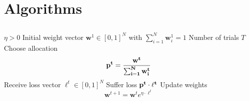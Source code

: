 
\chapter{Algorithms}
\label{app:algo}

\section{\hedge}
\label{app:hedge}

\begin{algorithm}
\caption{\hedge}
\begin{algorithmic}[1]
\Require 
\Statex $\eta>0$
\Statex Initial weight vector $\mathbf{w}^1\in [0,1]^N$ with $\sum_{i=1}^N \mathbf{w}^1_i=1$
\Statex Number of trials $T$
\State Choose allocation $$\bf p^t= \frac{\bf w^t}{\sum_{i=1}^N w^t_i}$$
\State Receive loss vector $\ell^t\in[0,1]^N$
\State Suffer loss $\bf p^t\cdot \ell^t$
\State Update weights $$\mathbf{w}^{t+1}=\mathbf{w}^te^{\eta\cdot\ell^{t}}$$
\EndFor
\EndProcedure
\end{algorithmic}
\end{algorithm}
\newpage
\section{\adaB}
\label{app:adaB}



\newpage
\section{\adaN}
